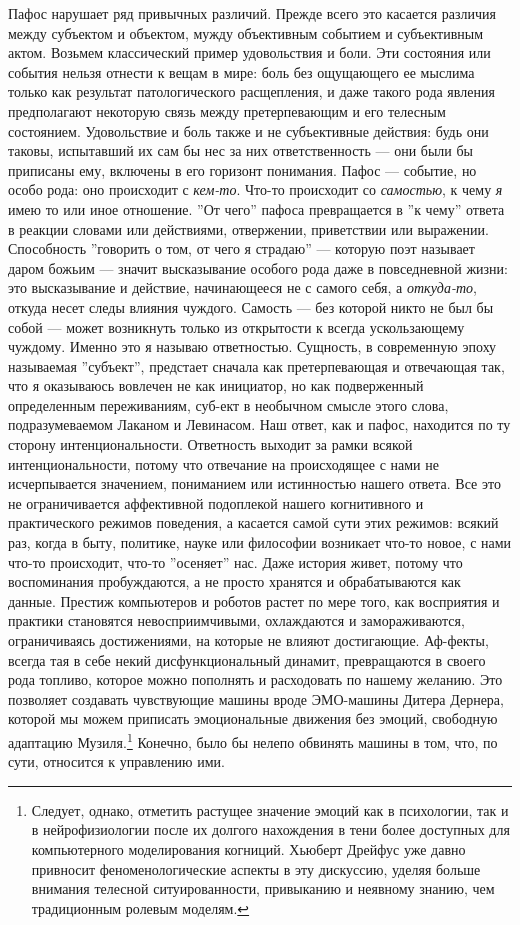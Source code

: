 \documentclass[12pt]{book}
\begin{document}
Пафос нарушает ряд привычных различий. Прежде всего это касается различия между субъектом и объектом, мужду объективным событием и субъективным актом. Возьмем классический пример удовольствия и боли. Эти состояния или события нельзя отнести к вещам в мире: боль без ощущающего ее мыслима только как результат патологического расщепления, и даже такого рода явления предполагают некоторую связь между претерпевающим и его телесным состоянием. Удовольствие и боль также и не субъективные действия: будь они таковы, испытавший их сам бы нес за них ответственность --- они были бы приписаны ему, включены в его горизонт понимания. Пафос --- событие, но особо рода: оно происходит с \textit{кем-то}. Что-то происходит со \textit{самостью}, к чему \textit{я} имею то или иное отношение. ''От чего'' пафоса превращается в ''к чему'' ответа в реакции словами или действиями, отвержении, приветствии или выражении. Способность ''говорить о том, от чего я страдаю'' --- которую поэт называет даром божьим --- значит высказывание особого рода даже в повседневной жизни: это высказывание и действие, начинающееся не с самого себя, а \textit{откуда-то}, откуда несет следы влияния чуждого. Самость --- без которой никто не был бы собой --- может возникнуть только из открытости к всегда ускользающему чуждому. Именно это я называю ответностью. Сущность, в современную эпоху называемая ''субъект'', предстает сначала как претерпевающая и отвечающая так, что я оказываюсь вовлечен не как инициатор, но как подверженный определенным переживаниям, суб-ект в необычном смысле этого слова, подразумеваемом Лаканом и Левинасом. Наш ответ, как и пафос, находится по ту сторону интенциональности. Ответность выходит за рамки всякой интенциональности, потому что отвечание на происходящее с нами не исчерпывается значением, пониманием или истинностью нашего ответа. Все это не ограничивается аффективной подоплекой нашего когнитивного и практического режимов поведения, а касается самой сути этих режимов: всякий раз, когда в быту, политике, науке или философии возникает что-то новое, с нами что-то происходит, что-то ''осеняет'' нас. Даже история живет, потому что воспоминания пробуждаются, а не просто хранятся и обрабатываются как данные. Престиж компьютеров и роботов растет по мере того, как восприятия и практики становятся невосприимчивыми, охлаждаются и замораживаются, ограничиваясь достижениями, на которые не влияют достигающие. Аф-фекты, всегда тая в себе некий дисфункциональный динамит, превращаются в своего рода топливо, которое можно  пополнять и расходовать по нашему желанию. Это позволяет создавать чувствующие машины вроде ЭМО-машины Дитера Дернера, которой мы можем приписать эмоциональные движения без эмоций, свободную адаптацию Музиля.\footnote{Следует, однако, отметить растущее значение эмоций как в психологии, так и в нейрофизиологии после их долгого нахождения в тени более доступных для компьютерного моделирования когниций. Хьюберт Дрейфус уже давно привносит феноменологические аспекты в эту дискуссию, уделяя больше внимания телесной ситуированности, привыканию и неявному знанию, чем традиционным ролевым моделям.} Конечно, было бы нелепо обвинять машины в том, что, по сути, относится к управлению ими.
\end{document}
